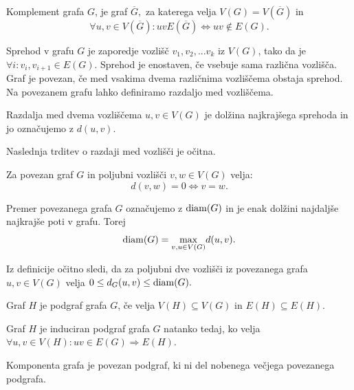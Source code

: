 \documentclass[mat1, tisk]{fmfdelo}
\newcommand{\1}{(1, 1, ..., 1)}
\newcommand{\2}{(2, 2, ..., 2)}
\begin{document}
\begin{definicija} \label{def:komplement}
    Komplement grafa $G$, je graf $\overline{G},$ za katerega velja $V(G) = V(\overline{G})$ in 
    $$\forall u,v \in V(\overline{G}): uv E(\overline{G}) \Leftrightarrow uv \not \in E(G).$$
\end{definicija}

Sprehod v grafu $G$ je zaporedje vozlišč $v_1, v_2, ... v_k$ iz $V(G)$, tako da je 
$\forall i : v_i, v_{i+1} \in E(G).$ Sprehod je enostaven, če vsebuje sama različna vozlišča.
Graf je povezan, če med vsakima dvema različnima vozliščema obstaja sprehod. Na povezanem
grafu lahko definiramo razdaljo med vozliščema.

\begin{definicija} \label{def:razdalja}
    Razdalja med dvema vozliščema $u, v \in V(G)$ je dolžina najkrajšega sprehoda in jo 
    označujemo z $d(u, v).$ 
\end{definicija}

Naslednja trditev o razdaji med vozlišči je očitna.

\begin{trditev} \label{trd:nicelna_razdalja}
    Za povezan graf $G$ in poljubni vozlišči $v, w \in V(G)$ velja:
    $$ d(v, w) = 0 \Leftrightarrow v=w.$$
\end{trditev} 

\begin{definicija} \label{def:premer}
    Premer povezanega grafa $G$ označujemo z ${\rm diam}(G)$ in je enak dolžini najdaljše najkrajše 
    poti v grafu. Torej $${\rm diam}(G) = \underset{v, u \in V(G)}{\max} d(u, v).$$
\end{definicija}

Iz definicije očitno sledi, da za poljubni dve vozlišči iz povezanega grafa $u, v \in V(G)$
velja $0 \leq d_G (u, v) \leq {\rm diam}(G).$

\begin{definicija} \label{def:podgraf}
    Graf $H$ je podgraf grafa $G$, če velja $V(H) \subseteq V(G)$ in 
    $E(H) \subseteq E(H)$.
\end{definicija}

\begin{definicija} \label{def:induciran_podgraf}
    Graf $H$ je induciran podgraf grafa $G$ natanko tedaj, ko velja 
    $\forall u, v \in V(H) : uv \in E(G) \Rightarrow E(H)$.
\end{definicija}

\begin{definicija} \label{def:komponenta}
Komponenta grafa je povezan podgraf, ki ni del nobenega večjega povezanega podgrafa. 
\end{definicija}
\end{document}
